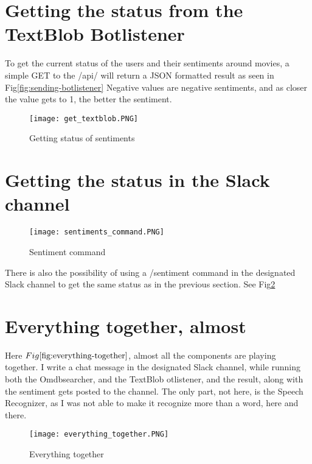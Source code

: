 \documentclass[11pt,fleqn]{book} %
\begin{document}
\newpage
\section{Getting the status from the TextBlob Botlistener}
To get the current status of the users and their sentiments around movies, a simple GET to the /api/ will return a JSON formatted result as seen in Fig\ref{fig:sending-botlistener} Negative values are negative sentiments, and as closer the value gets to 1, the better the sentiment. 
\begin{figure}[]
  \centering
   \texttt{[image: get\_textblob.PNG]}
  \caption{Getting status of sentiments}
  \label{fig:sentiment-status}
\end{figure}

\newpage
\section{Getting the status in the Slack channel}
\begin{figure}[]
  \centering
   \texttt{[image: sentiments\_command.PNG]}
  \caption{Sentiment command}
  \label{fig:sentiment-command}
\end{figure}
There is also the possibility of using a /sentiment command in the designated Slack channel to get the same status as in the previous section. See Fig\ref{fig:sentiment-command}

\newpage
\section{Everything together, almost}
Here \(Fig\ref{fig:everything-together}\), almost all the components are playing together. I write a chat message in the designated Slack channel, while running both the Omdbsearcher, and the TextBlob otlistener, and the result, along with the sentiment gets posted to the channel.
The only part, not here, is the Speech Recognizer, as I was not able to make it recognize more than a word, here and there.

\begin{figure}[]
  \centering
   \texttt{[image: everything\_together.PNG]}
  \caption{Everything together}
  \label{fig:everything-together}
\end{figure}

\end{document}
